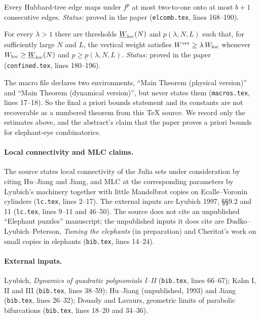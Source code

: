\begin{theorem}
\label{thm:kahn-IV-bounded-degree}
Every Hubbard-tree edge maps under $f^p$ at most two-to-one onto at most $b+1$ consecutive edges.
\emph{Status:} proved in the paper (\texttt{elcomb.tex}, lines 168--190).
\end{theorem}

\begin{theorem}[Amplification]
\label{thm:kahn-IV-amplification}
For every $\lambda>1$ there are thresholds $\underline W_{\rm loc}(N)$ and $\underline p(\lambda,N,L)$ such
that, for sufficiently large $N$ and $L$, the vertical weight satisfies $W^{\rm ver}\ge\lambda\,W_{\rm loc}$
whenever $W_{\rm loc}\ge\underline W_{\rm loc}(N)$ and $p\ge\underline p(\lambda,N,L)$.
\emph{Status:} proved in the paper (\texttt{confined.tex}, lines 180--196).
\end{theorem}

\begin{remark}
\label{rem:kahn-IV-unclear}
The macro file declares two environments, ``Main Theorem (physical version)'' and ``Main Theorem
(dynamical version)'', but never states them (\texttt{macros.tex}, lines 17--18).  So the final
a priori bounds statement and its constants are not recoverable as a numbered theorem from this
TeX source.  We record only the estimates above, and the abstract's claim that the paper proves a
priori bounds for elephant-eye combinatorics.
\end{remark}

\paragraph{Local connectivity and MLC claims.}
The source states local connectivity of the Julia sets under consideration by citing Hu--Jiang and Jiang,
and MLC at the corresponding parameters by Lyubich's machinery together with little Mandelbrot copies on
Ecalle--Voronin cylinders (\texttt{lc.tex}, lines 2--17).  The external inputs are Lyubich 1997, \S\S 9.2 and 11
(\texttt{lc.tex}, lines 9--11 and 46--50).  The source does not cite an unpublished ``Elephant puzzles''
manuscript; the unpublished inputs it does cite are Dudko--Lyubich--Peterson, \emph{Taming the elephants}
(in preparation) and Cheritat's work on small copies in elephants (\texttt{bib.tex}, lines 14--24).

\paragraph{External inputs.}
Lyubich, \emph{Dynamics of quadratic polynomials I--II} (\texttt{bib.tex}, lines 66--67); Kahn I, II and III
(\texttt{bib.tex}, lines 38--59); Hu--Jiang (unpublished, 1993) and Jiang (\texttt{bib.tex}, lines 26--32);
Douady and Lavaurs, geometric limits of parabolic bifurcations (\texttt{bib.tex}, lines 18--20 and 34--36).

